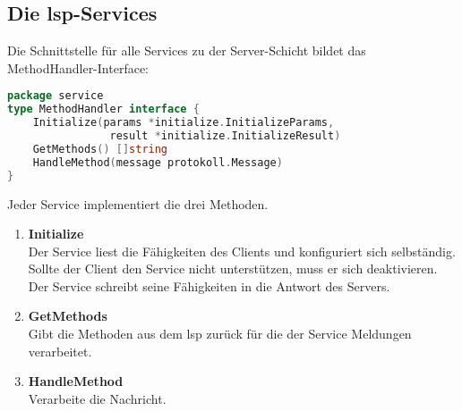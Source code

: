 \documentclass[./einleitung.tex]{subfiles}
\begin{document}
    \subsection{Die \acrshort{lsp}-Services}
    Die Schnittstelle für alle Services zu der Server-Schicht bildet das MethodHandler-Interface:
    \begin{lstlisting}[language=Go]
package service
type MethodHandler interface {
	Initialize(params *initialize.InitializeParams,
                result *initialize.InitializeResult)
	GetMethods() []string
	HandleMethod(message protokoll.Message)
}
    \end{lstlisting}
    Jeder Service implementiert die drei Methoden.
    \begin{enumerate}
        \item \textbf{Initialize} \\
        Der Service liest die Fähigkeiten des Clients und konfiguriert sich selbständig.
        Sollte der Client den Service nicht unterstützen, muss er sich deaktivieren.
        Der Service schreibt seine Fähigkeiten in die Antwort des Servers.
        \item \textbf{GetMethods} \\
        Gibt die Methoden aus dem \acrshort{lsp} zurück für die der Service Meldungen verarbeitet.
        \item \textbf{HandleMethod} \\
        Verarbeite die Nachricht.
    \end{enumerate}
\end{document}
